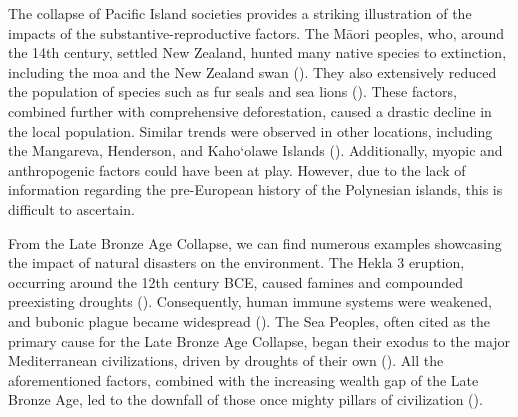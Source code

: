 \documentclass[12pt, a4paper, twoside]{article}
\begin{document}
The collapse of Pacific Island societies provides a striking illustration of the impacts of the substantive-reproductive factors. The Māori peoples, who, around the 14th century, settled New Zealand, hunted many native species to extinction, including the moa and the New Zealand swan (\cites[p.\ 358]{walter2017polynesian}[p.\ 4922]{allentoft2014extinct}[p.\ 1]{rawlence2017blackswans}). They also extensively reduced the population of species such as fur seals and sea lions (\cite[p.\ 1]{wilmshurst2007deforestation}). These factors, combined further with comprehensive deforestation, caused a drastic decline in the local population. Similar trends were observed in other locations, including the Mangareva, Henderson, and Kaho‘olawe Islands (\cites[p.\ 5]{fagan2010great}[p.\ 132]{diamond2005collapse}[p.\ 443]{rolett2004deforestation}[p.\ 336]{diamond1994ecological}). Additionally, myopic and anthropogenic factors could have been at play. However, due to the lack of information regarding the pre-European history of the Polynesian islands, this is difficult to ascertain.  

From the Late Bronze Age Collapse, we can find numerous examples showcasing the impact of natural disasters on the environment. The Hekla 3 eruption, occurring around the 12th century BCE, caused famines and compounded preexisting droughts (\cites[p.\ 340]{baker1995hekla}[pp.\ 456–458]{yurko1999end}[p.\ 719]{manning2023hittite}). Consequently, human immune systems were weakened, and bubonic plague became widespread (\cite[p.\ 1]{spyrou2018plague}). The Sea Peoples, often cited as the primary cause for the Late Bronze Age Collapse, began their exodus to the major Mediterranean civilizations, driven by droughts of their own (\cite[pp.\ 16–17]{carpenter1966discontinuity}). All the aforementioned factors, combined with the increasing wealth gap of the Late Bronze Age, led to the downfall of those once mighty pillars of civilization (\cites[pp.\ 20–22]{basri2020wealth}{weisweiler2022inequality}). 
\end{document}
